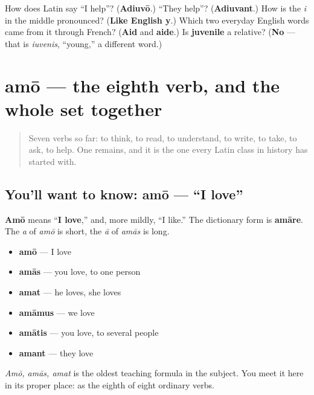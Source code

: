\begin{tcolorbox}[breakable,colback=teal!4,colframe=teal!35!black,title={Before you move on}]
How does Latin say \textquotedblleft{}I help\textquotedblright{}? (\textbf{Adiuvō}.) \textquotedblleft{}They help\textquotedblright{}? (\textbf{Adiuvant}.) How is the \emph{i} in the middle pronounced? (\textbf{Like English y}.) Which two everyday English words came from it through French? (\textbf{Aid} and \textbf{aide}.) Is \textbf{juvenile} a relative? (\textbf{No} — that is \emph{iuvenis}, \textquotedblleft{}young,\textquotedblright{} a different word.)
\end{tcolorbox}
\section[amō, amāre]{amō — the eighth verb, and the whole set together}

\label{lesson:LA-C38-amo}



\begin{quote}
Seven verbs so far: to think, to read, to understand, to write, to take, to ask, to help. One remains, and it is the one every Latin class in history has started with.
\end{quote}

\subsection*{You'll want to know: amō — \textquotedblleft{}I love\textquotedblright{}}
\textbf{Amō} means \textquotedblleft{}\textbf{I love},\textquotedblright{} and, more mildly, \textquotedblleft{}I like.\textquotedblright{} The dictionary form is \textbf{amāre}. The \emph{a} of \emph{amō} is short, the \emph{ā} of \emph{amās} is long.

\begin{itemize}
\raggedright
  \item \textbf{amō} — I love
  \item \textbf{amās} — you love, to one person
  \item \textbf{amat} — he loves, she loves
  \item \textbf{amāmus} — we love
  \item \textbf{amātis} — you love, to several people
  \item \textbf{amant} — they love
\end{itemize}

\emph{Amō, amās, amat} is the oldest teaching formula in the subject. You meet it here in its proper place: as the eighth of eight ordinary verbs.

